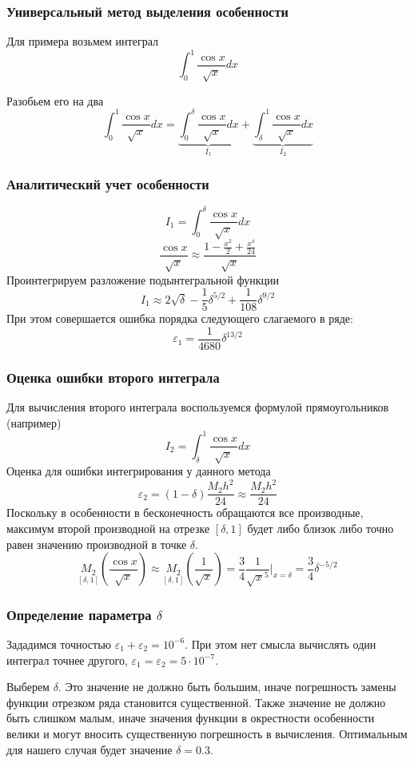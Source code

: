 \documentclass[apectratio=43,unicode]{beamer}
\begin{document}
\begin{frame}
\frametitle{Универсальный метод выделения особенности}
	Для примера возьмем интеграл
	\[
	\int_0^1 \frac{\cos x}{\sqrt{x}} dx
	\]
	\pause

	Разобьем его на два
	\[
	\int_0^1 \frac{\cos x}{\sqrt{x}} dx = \underbrace{\int_0^\delta \frac{\cos x}{\sqrt{x}} dx}_{I_1} +
	\underbrace{\int_\delta^1 \frac{\cos x}{\sqrt{x}} dx}_{I_2}
	\]
\end{frame}

\begin{frame}
\frametitle{Аналитический учет особенности}
	\[
	I_1 = \int_0^\delta \frac{\cos x}{\sqrt{x}} dx
	\]
	\[
	\frac{\cos x}{\sqrt{x}} \approx \frac{1 - \frac{x^2}{2} + \frac{x^4}{24}}{\sqrt{x}}
	\]
	Проинтегрируем разложение подынтегральной функции
	\[
	I_1 \approx 2\sqrt{\delta} - \frac{1}{5}\delta^{5/2} +
\frac{1}{108}\delta^{9/2}
	\]
	При этом совершается ошибка порядка следующего слагаемого в ряде:
	\[
	\varepsilon_1 = \frac{1}{4680}\delta^{13/2}
	\]
\end{frame}

\begin{frame}
\frametitle{Оценка ошибки второго интеграла}
	Для вычисления второго интеграла воспользуемся формулой прямоугольников (например)
	\[
	I_2 = \int_\delta^1 \frac{\cos x}{\sqrt{x}} dx
	\]
	Оценка для ошибки интегрирования у данного метода
	\[
	\varepsilon_2 = (1-\delta)\frac{M_2 h^2}{24} \approx \frac{M_2 h^2}{24}
	\]
	Поскольку в особенности в бесконечность обращаются все производные, максимум
	второй производной на отрезке $[\delta, 1]$ будет либо близок либо точно равен
	значению производной в точке $\delta$.
	\[
	\underset{[\delta, 1]}{M_2}\left(\frac{\cos x}{\sqrt{x}}\right) \approx
	\underset{[\delta, 1]}{M_2}\left(\frac{1}{\sqrt{x}}\right)
	= \frac{3}{4}\frac{1}{\sqrt{x}^5}\Big|_{x = \delta}
	= \frac{3}{4}\delta^{-5/2}
	\]
\end{frame}

\begin{frame}
\frametitle{Определение параметра $\delta$}
	Зададимся точностью $\varepsilon_1 + \varepsilon_2 = 10^{-6}$. При этом нет смысла
	вычислять один интеграл точнее другого, $\varepsilon_1 = \varepsilon_2 = 5\cdot10^{-7}$.

	Выберем $\delta$. Это значение не должно быть большим, иначе погрешность замены
	функции отрезком ряда становится существенной. Также значение не должно быть слишком малым,
	иначе значения функции в окрестности особенности велики и могут вносить существенную погрешность в вычисления.
	Оптимальным для нашего случая будет значение $\delta = 0.3$.
\end{frame}
\end{document}
